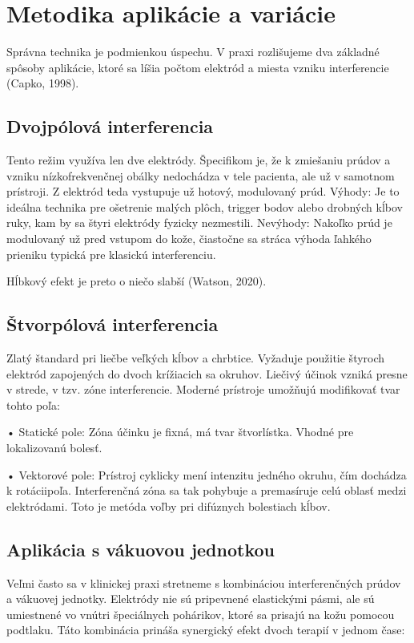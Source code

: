 \section{Metodika aplikácie a variácie}

Správna technika je podmienkou úspechu. V praxi rozlišujeme dva základné spôsoby aplikácie, ktoré sa líšia počtom elektród a miesta vzniku interferencie (Capko, 1998). 

\subsection{Dvojpólová interferencia}

Tento režim využíva len dve elektródy. Špecifikom je, že k zmiešaniu prúdov a vzniku nízkofrekvenčnej obálky nedochádza v tele pacienta, ale už v samotnom prístroji. Z elektród teda vystupuje už hotový, modulovaný prúd. Výhody: Je to ideálna technika pre ošetrenie malých plôch, trigger bodov alebo drobných kĺbov ruky, kam by sa štyri elektródy fyzicky nezmestili. Nevýhody: Nakoľko prúd je modulovaný už pred vstupom do kože, čiastočne sa stráca výhoda ľahkého prieniku typická pre klasickú interferenciu. 

Hĺbkový efekt je preto o niečo slabší (Watson, 2020). 

\subsection{Štvorpólová interferencia}

Zlatý štandard pri liečbe veľkých kĺbov a chrbtice. Vyžaduje použitie štyroch elektród zapojených do dvoch krížiacich sa okruhov. Liečivý účinok vzniká presne v strede, v tzv. zóne interferencie. Moderné prístroje umožňujú modifikovať tvar tohto poľa: 

• Statické pole: Zóna účinku je fixná, má tvar štvorlístka. Vhodné pre lokalizovanú bolesť. 

• Vektorové pole: Prístroj cyklicky mení intenzitu jedného okruhu, čím dochádza k rotáciipoľa. Interferenčná zóna sa tak pohybuje a premasíruje celú oblasť medzi elektródami. Toto je metóda voľby pri difúznych bolestiach kĺbov. 

\subsection{Aplikácia s vákuovou jednotkou}

Veľmi často sa v klinickej praxi stretneme s kombináciou interferenčných prúdov a vákuovej jednotky. Elektródy nie sú pripevnené elastickými pásmi, ale sú umiestnené vo vnútri špeciálnych pohárikov, ktoré sa prisajú na kožu pomocou podtlaku. Táto kombinácia prináša synergický efekt dvoch terapií v jednom čase: 

